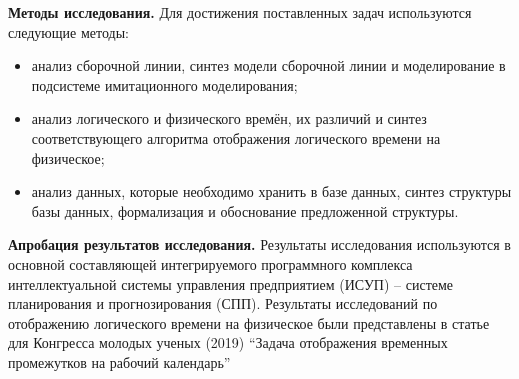 \indent \textbf{Методы исследования.}
Для достижения поставленных задач используются следующие методы:
\begin{itemize}
	\item анализ сборочной линии, синтез модели сборочной линии и моделирование в подсистеме имитационного моделирования;
	\item анализ логического и физического времён, их различий и синтез соответствующего алгоритма отображения логического времени на физическое;
	\item анализ данных, которые необходимо хранить в базе данных, синтез структуры базы данных, формализация и обоснование предложенной структуры.
\end{itemize}
\indent \textbf{Апробация результатов исследования.}
Результаты исследования используются в основной составляющей интегрируемого программного комплекса интеллектуальной системы управления предприятием (ИСУП) – системе планирования и прогнозирования (СПП). 
Результаты исследований по отображению логического времени на физическое были представлены в статье для Конгресса молодых ученых (2019) ``Задача отображения временных промежутков на рабочий календарь''
